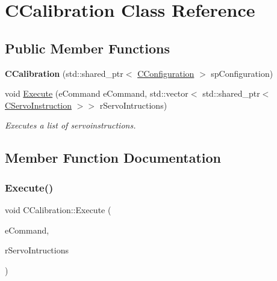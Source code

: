 \hypertarget{classCCalibration}{}\section{C\+Calibration Class Reference}
\label{classCCalibration}
\subsection*{Public Member Functions}
\begin{DoxyCompactItemize}
\item 
\mbox{\label{classCCalibration_a75081bf25db698d8aad2ab0398bc3ea0}} 
{\bfseries C\+Calibration} (std\+::shared\+\_\+ptr$<$ \hyperlink{classCConfiguration}{C\+Configuration} $>$ sp\+Configuration)
\item 
void \hyperlink{classCCalibration_a7174f917aab0eec5fbfc5f9f7ea2dcfb}{Execute} (e\+Command e\+Command, std\+::vector$<$ std\+::shared\+\_\+ptr$<$ \hyperlink{classCServoInstruction}{C\+Servo\+Instruction} $>$$>$ r\+Servo\+Intructions)
\begin{DoxyCompactList}\small\item\em Executes a list of servoinstructions. \end{DoxyCompactList}\end{DoxyCompactItemize}


\subsection{Member Function Documentation}
\mbox{\label{classCCalibration_a7174f917aab0eec5fbfc5f9f7ea2dcfb}} 
\subsubsection{\texorpdfstring{Execute()}{Execute()}}
{\footnotesize\ttfamily void C\+Calibration\+::\+Execute (\begin{DoxyParamCaption}\item[{e\+Command}]{e\+Command,  }\item[{std\+::vector$<$ std\+::shared\+\_\+ptr$<$ \hyperlink{classCServoInstruction}{C\+Servo\+Instruction} $>$$>$}]{r\+Servo\+Intructions }\end{DoxyParamCaption})}



